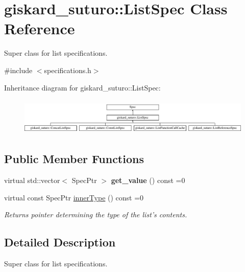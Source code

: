 \hypertarget{classgiskard__suturo_1_1ListSpec}{\section{giskard\-\_\-suturo\-:\-:List\-Spec Class Reference}
\label{classgiskard__suturo_1_1ListSpec}
}


Super class for list specifications.  




{\ttfamily \#include $<$specifications.\-h$>$}

Inheritance diagram for giskard\-\_\-suturo\-:\-:List\-Spec\-:\begin{figure}[H]
\begin{center}
\leavevmode
\includegraphics[height=1.779661cm]{classgiskard__suturo_1_1ListSpec}
\end{center}
\end{figure}
\subsection*{Public Member Functions}
\begin{DoxyCompactItemize}
\item 
\hypertarget{classgiskard__suturo_1_1ListSpec_abffa4ce634ef502a00284916b2464c28}{virtual std\-::vector$<$ Spec\-Ptr $>$ {\bfseries get\-\_\-value} () const =0}\label{classgiskard__suturo_1_1ListSpec_abffa4ce634ef502a00284916b2464c28}

\item 
virtual const Spec\-Ptr \hyperlink{classgiskard__suturo_1_1ListSpec_aba0a625da0d48e702aa723fb6fb3bc7e}{inner\-Type} () const =0
\begin{DoxyCompactList}\small\item\em Returns pointer determining the type of the list's contents. \end{DoxyCompactList}\end{DoxyCompactItemize}


\subsection{Detailed Description}
Super class for list specifications. 

